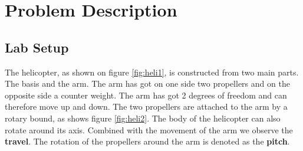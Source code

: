 \section{Problem Description}\label{sec:prob_descr}
\subsection{Lab Setup}
The helicopter, as shown on figure \ref{fig:heli1}, is constructed from two main parts. The basis and the arm. The arm has got on one side two propellers and on the opposite side a counter weight. The arm has got 2 degrees of freedom and can therefore move up and down. The two propellers are attached to the arm by a rotary bound, as shows figure \ref{fig:heli2}. 
The body of the helicopter can also rotate around its axis. Combined with the movement of the arm we observe the \textbf{travel}. The rotation of the propellers around the arm is denoted as the \textbf{pitch}. 	

